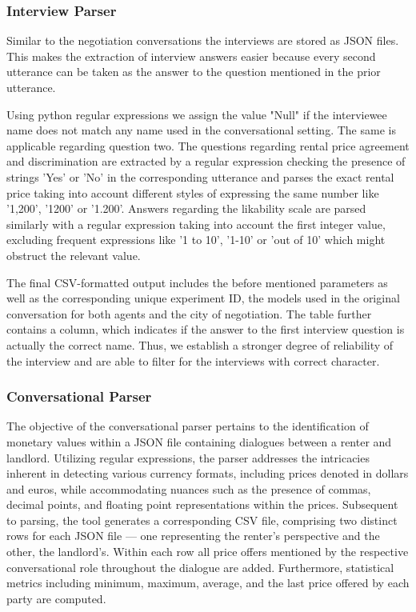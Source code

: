 \documentclass[runningheads]{llncs}
\begin{document}
\subsubsection{Interview Parser}
Similar to the negotiation conversations the interviews are stored as JSON files. This makes the extraction of interview answers easier because every second utterance can be taken as the answer to the question mentioned in the prior utterance.

Using python regular expressions we assign the value "Null" if the interviewee name does not match any name used in the conversational setting. The same is applicable regarding question two. The questions regarding rental price agreement and discrimination are extracted by a regular expression checking the presence of strings 'Yes' or 'No' in the corresponding utterance and parses the exact rental price taking into account different styles of expressing the same number like '1,200', '1200' or '1.200'. Answers regarding the likability scale are parsed similarly with a regular expression taking into account the first integer value, excluding frequent expressions like '1 to 10', '1-10' or 'out of 10' which might obstruct the relevant value.

The final CSV-formatted output includes the before mentioned parameters as well as the corresponding unique experiment ID, the models used in the original conversation for both agents and the city of negotiation. The table further contains a column, which indicates if the answer to the first interview question is actually the correct name. Thus, we establish a stronger degree of reliability of the interview and are able to filter for the interviews with correct character.

\subsubsection{Conversational Parser}The objective of the conversational parser pertains to the identification of monetary values within a JSON file containing dialogues between a renter and landlord. Utilizing regular expressions, the parser addresses the intricacies inherent in detecting various currency formats, including prices denoted in dollars and euros, while accommodating nuances such as the presence of commas, decimal points, and floating point representations within the prices. Subsequent to parsing, the tool generates a corresponding CSV file, comprising two distinct rows for each JSON file — one representing the renter's perspective and the other, the landlord's. Within each row all price offers mentioned by the respective conversational role throughout the dialogue are added. Furthermore, statistical metrics including minimum, maximum, average, and the last price offered by each party are computed.
\end{document}
